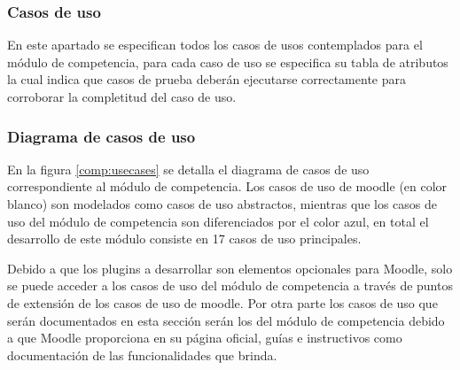 
\clearpage
\subsubsection{Casos de uso} %

 En este apartado se especifican todos los casos de usos contemplados para el módulo de
competencia, para cada caso de uso se especifica su tabla de atributos la cual indica que casos
 de prueba deberán ejecutarse correctamente para corroborar la completitud del caso de uso.

\subsubsection*{Diagrama de casos de uso}

 En la figura \ref{comp:usecases} se detalla el diagrama de casos de uso correspondiente al módulo
 de competencia. Los casos de uso de moodle (en color blanco) son modelados como casos de uso
 abstractos, mientras que los casos de uso del módulo de competencia son diferenciados por el
 color azul, en total el desarrollo de este módulo consiste en 17 casos de uso principales.


 \noindent
 Debido a que los plugins a desarrollar son elementos opcionales para Moodle, solo se puede
 acceder a los casos de uso del módulo de competencia a través de puntos de extensión de los
 casos de uso de moodle. Por otra parte los casos de uso que serán documentados en esta sección
 serán los del módulo de competencia debido a que Moodle proporciona en su página oficial, guías
 e instructivos como documentación de las funcionalidades que brinda.


















